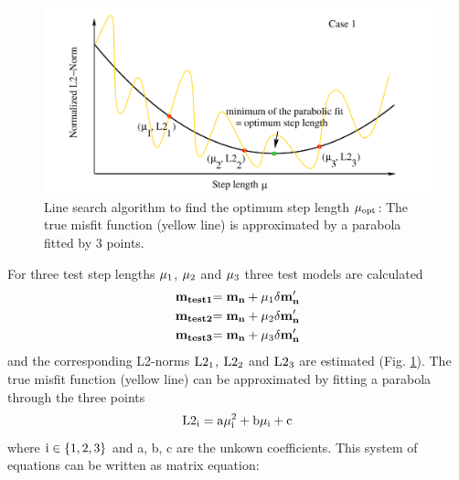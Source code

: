 \begin{figure}[ht]
\begin{center}
\includegraphics[width=15cm]{figures/sl_case1_final}
\caption{Line search algorithm to find the optimum step length $\rm{\mu_{opt}}$: The true misfit function (yellow line) is approximated by a parabola fitted by 3 points.}
\label{sl_case1_final}
\end{center}
\end{figure}
For three test step lengths $\rm{\mu_1}$, $\rm{\mu_2}$ and $\rm{\mu_3}$ three test models are calculated 
\begin{equation}
\begin{split}
\rm{\mathbf{m_{test1}}} &\rm{= \mathbf{m_{n}} + \mu_1 \delta \mathbf{m'_n}}\\
\rm{\mathbf{m_{test2}}} &\rm{= \mathbf{m_{n}} + \mu_2 \delta \mathbf{m'_n}}\\
\rm{\mathbf{m_{test3}}} &\rm{= \mathbf{m_{n}} + \mu_3 \delta \mathbf{m'_n}}\\
\end{split}
\label{parabola1:1}
\end{equation}              
and the corresponding L2-norms $\rm{L2_1}$, $\rm{L2_2}$ and $\rm{L2_3}$ are estimated (Fig. \ref{sl_case1_final}). The true misfit function (yellow line) can be approximated by fitting a parabola through the three points
\begin{equation}
\rm{L2_i = a \mu_i^2 + b \mu_i + c}
\label{parabola}
\end{equation}              
where $\rm{i \in \{1,2,3\}}$ and a, b, c are the unkown coefficients. 
This system of equations can be written as matrix equation:
